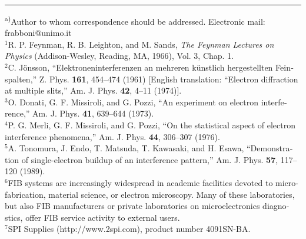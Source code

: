 \documentclass{article}
\begin{document}
\vspace{2em}
\hrule
\vspace{1em}
\begin{latin}
\small
\noindent
\textsuperscript{a)}Author to whom correspondence should be addressed. Electronic mail: frabboni@unimo.it\\
$^1$R. P. Feynman, R. B. Leighton, and M. Sands, \textit{The Feynman Lectures on Physics} (Addison-Wesley, Reading, MA, 1966), Vol. 3, Chap. 1.\\
$^2$C. Jönsson, ``Elektroneninterferenzen an mehreren künstlich hergestellten Feinspalten,'' Z. Phys. \textbf{161}, 454--474 (1961) [English translation: ``Electron diffraction at multiple slits,'' Am. J. Phys. \textbf{42}, 4--11 (1974)].\\
$^3$O. Donati, G. F. Missiroli, and G. Pozzi, ``An experiment on electron interference,'' Am. J. Phys. \textbf{41}, 639--644 (1973).\\
$^4$P. G. Merli, G. F. Missiroli, and G. Pozzi, ``On the statistical aspect of electron interference phenomena,'' Am. J. Phys. \textbf{44}, 306--307 (1976).\\
$^5$A. Tonomura, J. Endo, T. Matsuda, T. Kawasaki, and H. Esawa, ``Demonstration of single-electron buildup of an interference pattern,'' Am. J. Phys. \textbf{57}, 117--120 (1989).\\
$^6$FIB systems are increasingly widespread in academic facilities devoted to micro-fabrication, material science, or electron microscopy. Many of these laboratories, but also FIB manufacturers or private laboratories on microelectronics diagnostics, offer FIB service activity to external users.\\
$^7$SPI Supplies (http://www.2spi.com), product number 4091SN-BA.
\end{latin}
\end{document}
